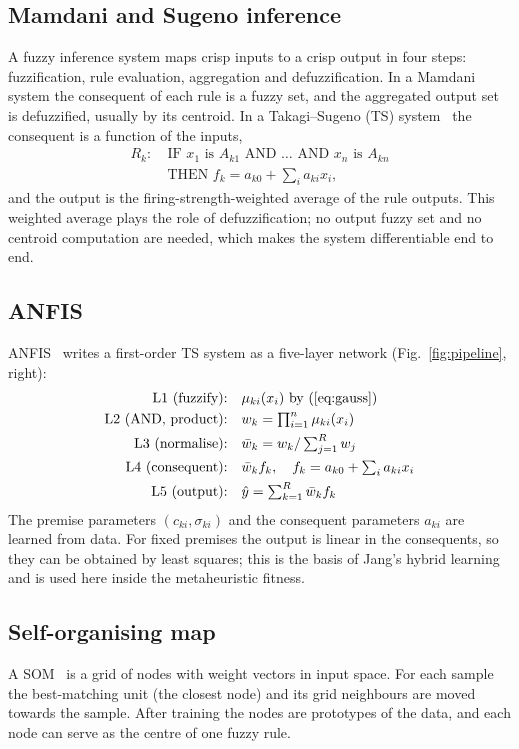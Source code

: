 \documentclass[conference]{IEEEtran}
\begin{document}
\subsection{Mamdani and Sugeno inference}
A fuzzy inference system maps crisp inputs to a crisp output in four steps: fuzzification, rule evaluation, aggregation and defuzzification. In a Mamdani system the consequent of each rule is a fuzzy set, and the aggregated output set is defuzzified, usually by its centroid. In a Takagi--Sugeno (TS) system~\cite{takagi1985} the consequent is a function of the inputs,
\begin{align*}
R_k:\ &\text{IF } x_1 \text{ is } A_{k1} \text{ AND } \dots \text{ AND } x_n \text{ is } A_{kn}\\
&\text{THEN } f_k = a_{k0} + \textstyle\sum_i a_{ki}x_i ,
\end{align*}
and the output is the firing-strength-weighted average of the rule outputs. This weighted average plays the role of defuzzification; no output fuzzy set and no centroid computation are needed, which makes the system differentiable end to end.

\subsection{ANFIS}
ANFIS~\cite{jang1993} writes a first-order TS system as a five-layer network (Fig.~\ref{fig:pipeline}, right):
\begin{align}
\text{L1 (fuzzify):}\quad & \mu_{ki}(x_i) \text{ by (\ref{eq:gauss})} \nonumber\\
\text{L2 (AND, product):}\quad & w_k = \textstyle\prod_{i=1}^{n}\mu_{ki}(x_i) \nonumber\\
\text{L3 (normalise):}\quad & \bar w_k = w_k / \textstyle\sum_{j=1}^{R} w_j \nonumber\\
\text{L4 (consequent):}\quad & \bar w_k f_k,\quad f_k = a_{k0}+\textstyle\sum_i a_{ki}x_i \nonumber\\
\text{L5 (output):}\quad & \hat y = \textstyle\sum_{k=1}^{R}\bar w_k f_k \label{eq:anfis}
\end{align}
The premise parameters $(c_{ki},\sigma_{ki})$ and the consequent parameters $a_{ki}$ are learned from data. For fixed premises the output is linear in the consequents, so they can be obtained by least squares; this is the basis of Jang's hybrid learning and is used here inside the metaheuristic fitness.

\subsection{Self-organising map}
A SOM~\cite{kohonen1990} is a grid of nodes with weight vectors in input space. For each sample the best-matching unit (the closest node) and its grid neighbours are moved towards the sample. After training the nodes are prototypes of the data, and each node can serve as the centre of one fuzzy rule.
\end{document}
